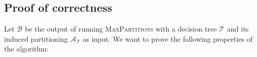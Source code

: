 \begin{algorithm}[!ht]
\begin{algorithmic}[1]


                \Else
                \EndIf%

            \EndWhile%

            \item[]

        \EndWhile%


    \end{algorithmic}

\end{algorithm}



\subsection{Proof of correctness}%
\label{sec:proofCorrectness}

\noindent
Let $\mathcal{B}$ be the output of running \textsc{MaxPartitions} with a
decision tree $\mathcal{T}$ and its induced partitioning
$\mathcal{A}_{\mathcal{T}}$ as input. We want to prove the following properties
of the algorithm:

